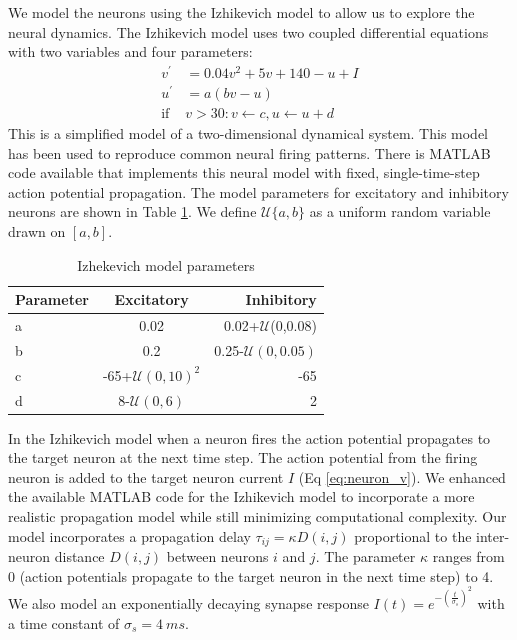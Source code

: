 \documentclass[a4paper,11pt]{article}
\begin{document}
We model the neurons using the Izhikevich model \cite{izhikevich2003} to allow us to explore the neural dynamics.
The Izhikevich model uses two coupled differential equations with two variables and four parameters:
\begin{align}
 v^\prime &= 0.04v^2+5v+140-u+I \label{eq:neuron_v} \\
 u^\prime &= a(bv-u)\\
 \text{if } &v>30: v\leftarrow c, u\leftarrow u+d
\end{align}
This is a simplified model of a two-dimensional dynamical system.
This model has been used to reproduce common neural firing patterns.
There is MATLAB code available \cite{izzy_code} that implements this neural model with fixed, single-time-step action potential propagation.
The model parameters for excitatory and inhibitory neurons are shown in Table \ref{tab:izzy_params}.
We define $\mathcal{U}\{a,b \}$ as a uniform random variable drawn on $[ a,b ] $.
\begin{table}[!h]
 \caption{Izhekevich model parameters}
 \label{tab:izzy_params}
 \centering
 \begin{tabular}{l|c|r}
  \textbf{Parameter} & \textbf{Excitatory} & \textbf{Inhibitory} \\
  \hline
  a & 0.02 & 0.02+$\mathcal{U}$(0,0.08) \\
  b & 0.2 & 0.25-$\mathcal{U}(0,0.05)$\\
  c & -65+$\mathcal{U}(0,10)^2$ & -65 \\
  d & 8-$\mathcal{U}(0,6)$& 2 \\
 \end{tabular}
\end{table}

In the Izhikevich model when a neuron fires the action potential propagates to the target neuron at the next time step.
The action potential from the firing neuron is added to the target neuron current $I$ (Eq \ref{eq:neuron_v}).
We enhanced the available MATLAB code for the Izhikevich model to incorporate a more realistic propagation model while still minimizing computational complexity.
Our model incorporates a propagation delay $\tau_{ij}=\kappa D(i,j)$ proportional to the inter-neuron distance $D(i,j)$ between neurons $i$ and $j$. 
The parameter $\kappa$ ranges from 0 (action potentials propagate to the target neuron in the next time step) to 4. 
We also model an exponentially decaying synapse response $I(t)=e^{-(\frac{t}{\sigma_s})^2}$ with a time constant of $\sigma_s=4~ms$.
\end{document}
